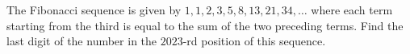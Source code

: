 The Fibonacci sequence is given by $1, 1, 2, 3, 5, 8, 13, 21, 34, \ldots$ where each term starting from the third is equal to the sum of the two preceding terms. Find the last digit of the number in the $2023$-rd position of this sequence.
